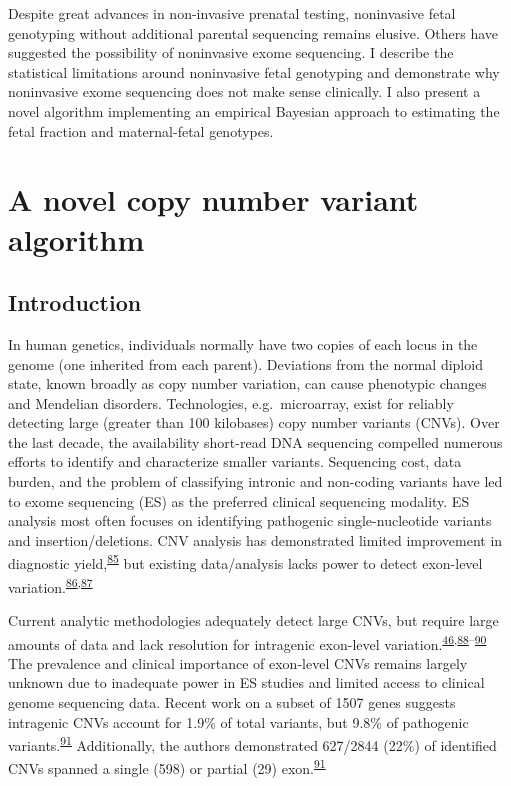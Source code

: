 \documentclass[11pt,letterpaper]{book}
\begin{document}
Despite great advances in non-invasive prenatal testing, noninvasive fetal genotyping without additional parental sequencing remains elusive.
Others have suggested the possibility of noninvasive exome sequencing.
I describe the statistical limitations around noninvasive fetal genotyping and demonstrate why noninvasive exome sequencing does not make sense clinically.
I also present a novel algorithm implementing an empirical Bayesian approach to estimating the fetal fraction and maternal-fetal genotypes.

\hypertarget{mcCNV}{%
\chapter{A novel copy number variant algorithm}\label{mcCNV}}

\hypertarget{introduction}{%
\section{Introduction}\label{introduction}}

In human genetics, individuals normally have two copies of each locus in the genome (one inherited from each parent).
Deviations from the normal diploid state, known broadly as copy number variation, can cause phenotypic changes and Mendelian disorders.
Technologies, e.g.~microarray, exist for reliably detecting large (greater than 100 kilobases) copy number variants (CNVs).
Over the last decade, the availability short-read DNA sequencing compelled numerous efforts to identify and characterize smaller variants.
Sequencing cost, data burden, and the problem of classifying intronic and non-coding variants have led to exome sequencing (ES) as the preferred clinical sequencing modality.
ES analysis most often focuses on identifying pathogenic single-nucleotide variants and insertion/deletions.
CNV analysis has demonstrated limited improvement in diagnostic yield,\textsuperscript{\protect\hyperlink{ref-marchuk:2018aa}{85}} but existing data/analysis lacks power to detect exon-level variation.\textsuperscript{\protect\hyperlink{ref-retterer:2015aa}{86},\protect\hyperlink{ref-yao:2017aa}{87}}

Current analytic methodologies adequately detect large CNVs, but require large amounts of data and lack resolution for intragenic exon-level variation.\textsuperscript{\protect\hyperlink{ref-plagnol:2012aa}{46},\protect\hyperlink{ref-fromer:2012aa}{88}--\protect\hyperlink{ref-krumm:2012aa}{90}}
The prevalence and clinical importance of exon-level CNVs remains largely unknown due to inadequate power in ES studies and limited access to clinical genome sequencing data.
Recent work on a subset of 1507 genes suggests intragenic CNVs account for 1.9\% of total variants, but 9.8\% of pathogenic variants.\textsuperscript{\protect\hyperlink{ref-truty:2019aa}{91}}
Additionally, the authors demonstrated 627/2844 (22\%) of identified CNVs spanned a single (598) or partial (29) exon.\textsuperscript{\protect\hyperlink{ref-truty:2019aa}{91}}
\end{document}
